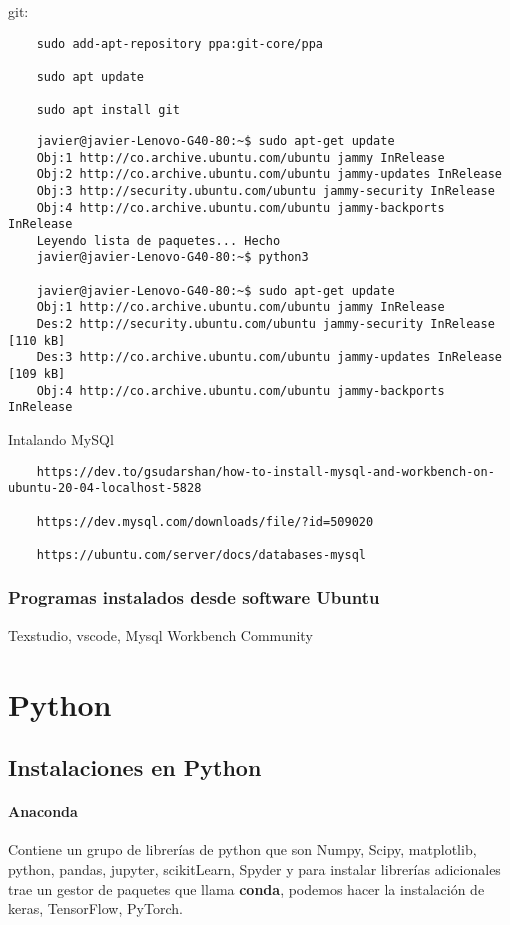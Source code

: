 git: 
\begin{verbatim}
	sudo add-apt-repository ppa:git-core/ppa 
	
	sudo apt update 
	
	sudo apt install git
\end{verbatim}
\begin{verbatim}
	javier@javier-Lenovo-G40-80:~$ sudo apt-get update
	Obj:1 http://co.archive.ubuntu.com/ubuntu jammy InRelease
	Obj:2 http://co.archive.ubuntu.com/ubuntu jammy-updates InRelease
	Obj:3 http://security.ubuntu.com/ubuntu jammy-security InRelease
	Obj:4 http://co.archive.ubuntu.com/ubuntu jammy-backports InRelease
	Leyendo lista de paquetes... Hecho
	javier@javier-Lenovo-G40-80:~$ python3
	
	javier@javier-Lenovo-G40-80:~$ sudo apt-get update
	Obj:1 http://co.archive.ubuntu.com/ubuntu jammy InRelease
	Des:2 http://security.ubuntu.com/ubuntu jammy-security InRelease [110 kB]
	Des:3 http://co.archive.ubuntu.com/ubuntu jammy-updates InRelease [109 kB]
	Obj:4 http://co.archive.ubuntu.com/ubuntu jammy-backports InRelease	
\end{verbatim}

Intalando MySQl 

\begin{verbatim}
	https://dev.to/gsudarshan/how-to-install-mysql-and-workbench-on-ubuntu-20-04-localhost-5828 
	
	https://dev.mysql.com/downloads/file/?id=509020 
	
	https://ubuntu.com/server/docs/databases-mysql
\end{verbatim}


\section{Programas instalados desde software Ubuntu}
Texstudio, vscode, Mysql Workbench Community

\part{Python}

\chapter{Instalaciones en Python}



\subsection{Anaconda}
Contiene un grupo de librer\'ias de python que son Numpy, Scipy, matplotlib, python, pandas, jupyter, scikitLearn, Spyder y para instalar librer\'ias adicionales trae un gestor de paquetes que llama {\bf conda}, podemos hacer la instalaci\'on de keras, TensorFlow, PyTorch.

